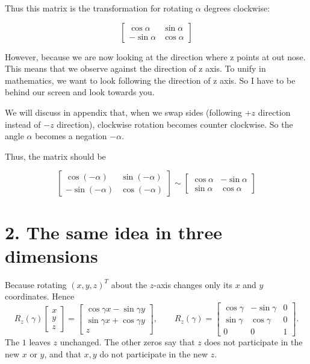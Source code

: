 \documentclass[10pt]{article}
\newcommand{\cG}{\cos\gamma}
\newcommand{\sG}{\sin\gamma}
\begin{document}
Thus this matrix is the transformation for rotating $\alpha$ degrees clockwise:

\[
\begin{bmatrix}
     \cos\alpha & \sin\alpha\\
    -\sin\alpha & \cos\alpha
   \end{bmatrix}
\]

However, because we are now looking at the direction where z points at out nose. This means that we observe against the direction of z axis. To unify in mathematics, we want to look following the direction of z axis. So I have to be behind our screen and look towards you. 

We will discuss in appendix that, when we swap sides (following $+z$ direction instead of $-z$ direction), clockwise rotation becomes counter clockwise. So the angle $\alpha$ becomes a negation $-\alpha$.

Thus, the matrix should be 

\[
\begin{bmatrix}
     \cos(-\alpha) & \sin(-\alpha)\\
    -\sin(-\alpha) & \cos(-\alpha)
   \end{bmatrix}
\sim
   \begin{bmatrix}
     \cos\alpha & -\sin\alpha\\
    \sin\alpha & \cos\alpha
   \end{bmatrix}
\]


\section*{2. The same idea in three dimensions}
Because rotating $(x,y,z)^T$ about the $z$-axis changes only its $x$ and $y$
coordinates.  Hence
\[
 R_z(\gamma)\begin{bmatrix}x\\y\\z\end{bmatrix}
 =\begin{bmatrix}\cG{}x-\sG{}y\\\sG{}x+\cG{}y\\z\end{bmatrix},\qquad
 R_z(\gamma)=
 \begin{bmatrix}
 \cG&-\sG&0\\
 \sG&\cG&0\\
 0&0&1
 \end{bmatrix}.
\]
The $1$ leaves $z$ unchanged.  The other zeros say that $z$ does not participate in the new $x$ or $y$, and that $x,y$ do not participate in the new $z$. 
\end{document}
